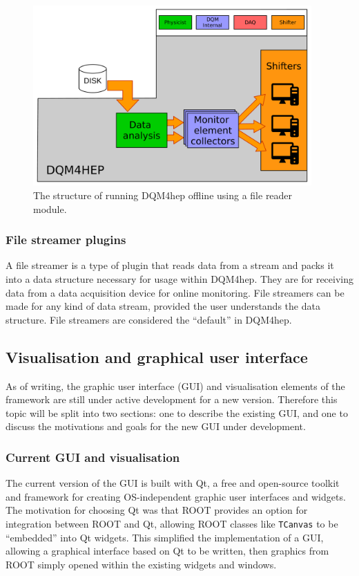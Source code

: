 \begin{figure}[p]
	\centering
	\includegraphics[width=0.95\textwidth]{../Pictures/FileReaderModuleArchitecture.pdf}
	\caption{The structure of running DQM4hep offline using a file reader module.}
	\label{figure:daq/dqm4hep/file-reader}
\end{figure}

\subsubsection{File streamer plugins}
A file streamer is a type of plugin that reads data from a stream and packs it into a data structure necessary for usage within DQM4hep. They are for receiving data from a data acquisition device for online monitoring. File streamers can be made for any kind of data stream, provided the user understands the data structure. File streamers are considered the ``default'' in DQM4hep.

\subsection{Visualisation and graphical user interface}
As of writing, the graphic user interface (GUI) and visualisation elements of the framework are still under active development for a new version. Therefore this topic will be split into two sections: one to describe the existing GUI, and one to discuss the motivations and goals for the new GUI under development. 

\subsubsection{Current GUI and visualisation} 
The current version of the GUI is built with Qt, a free and open-source toolkit and framework for creating OS-independent graphic user interfaces and widgets. The motivation for choosing Qt was that ROOT provides an option for integration between ROOT and Qt, allowing ROOT classes like \texttt{TCanvas} to be ``embedded'' into Qt widgets. This simplified the implementation of a GUI, allowing a graphical interface based on Qt to be written, then graphics from ROOT simply opened within the existing widgets and windows. %

